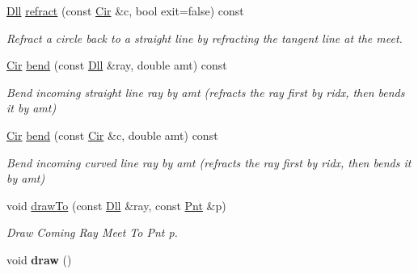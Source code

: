 \begin{DoxyCompactItemize}
\item 
\hypertarget{structvsr_1_1_opt_surf_a582a25cecf3fa176f2ad201bca329729}{\hyperlink{namespacevsr_a6c6892b7aec25cfb16492501e2e35b11}{Dll} \hyperlink{structvsr_1_1_opt_surf_a582a25cecf3fa176f2ad201bca329729}{refract} (const \hyperlink{namespacevsr_a2744605aa828e495fc85463b7ae0d045}{Cir} \&c, bool exit=false) const }\label{structvsr_1_1_opt_surf_a582a25cecf3fa176f2ad201bca329729}

\begin{DoxyCompactList}\small\item\em Refract a circle back to a straight line by refracting the tangent line at the meet. \end{DoxyCompactList}\item 
\hypertarget{structvsr_1_1_opt_surf_a0f4baeaab2623a16ef369c92a2d9f1ea}{\hyperlink{namespacevsr_a2744605aa828e495fc85463b7ae0d045}{Cir} \hyperlink{structvsr_1_1_opt_surf_a0f4baeaab2623a16ef369c92a2d9f1ea}{bend} (const \hyperlink{namespacevsr_a6c6892b7aec25cfb16492501e2e35b11}{Dll} \&ray, double amt) const }\label{structvsr_1_1_opt_surf_a0f4baeaab2623a16ef369c92a2d9f1ea}

\begin{DoxyCompactList}\small\item\em Bend incoming straight line ray by amt (refracts the ray first by ridx, then bends it by amt) \end{DoxyCompactList}\item 
\hypertarget{structvsr_1_1_opt_surf_a4f4aa3d16a959c84f58f4c4999746971}{\hyperlink{namespacevsr_a2744605aa828e495fc85463b7ae0d045}{Cir} \hyperlink{structvsr_1_1_opt_surf_a4f4aa3d16a959c84f58f4c4999746971}{bend} (const \hyperlink{namespacevsr_a2744605aa828e495fc85463b7ae0d045}{Cir} \&c, double amt) const }\label{structvsr_1_1_opt_surf_a4f4aa3d16a959c84f58f4c4999746971}

\begin{DoxyCompactList}\small\item\em Bend incoming curved line ray by amt (refracts the ray first by ridx, then bends it by amt) \end{DoxyCompactList}\item 
\hypertarget{structvsr_1_1_opt_surf_a2b458c9635e219c4391dee2000dbb990}{void \hyperlink{structvsr_1_1_opt_surf_a2b458c9635e219c4391dee2000dbb990}{draw\-To} (const \hyperlink{namespacevsr_a6c6892b7aec25cfb16492501e2e35b11}{Dll} \&ray, const \hyperlink{namespacevsr_a2d05beb9721c5d9211b479af6d47222d}{Pnt} \&p)}\label{structvsr_1_1_opt_surf_a2b458c9635e219c4391dee2000dbb990}

\begin{DoxyCompactList}\small\item\em Draw Coming Ray Meet To Pnt p. \end{DoxyCompactList}\item 
\hypertarget{structvsr_1_1_opt_surf_a4c553832f71222dbf0aed59ae2903b6c}{void {\bfseries draw} ()}\label{structvsr_1_1_opt_surf_a4c553832f71222dbf0aed59ae2903b6c}

\end{DoxyCompactItemize}
